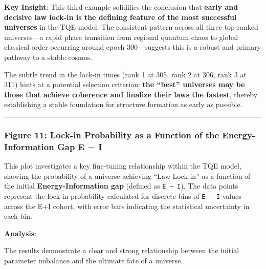\textbf{Key Insight}: This third example solidifies the conclusion that
\textbf{early and decisive law lock-in is the defining feature of the
most successful universes} in the TQE model. The consistent pattern
across all three top-ranked universes---a rapid phase transition from
regional quantum chaos to global classical order occurring around epoch
300---suggests this is a robust and primary pathway to a stable cosmos.

The subtle trend in the lock-in times (rank 1 at 305, rank 2 at 306,
rank 3 at 311) hints at a potential selection criterion: \textbf{the
``best'' universes may be those that achieve coherence and finalize
their laws the fastest}, thereby establishing a stable foundation for
structure formation as early as possible.

\begin{center}\rule{0.5\linewidth}{0.5pt}\end{center}

\subsubsection{Figure 11: Lock-in Probability as a Function of the
Energy-Information Gap \textbar E −
I\textbar{}}\label{figure-11-lock-in-probability-as-a-function-of-the-energy-information-gap-e-i}

This plot investigates a key fine-tuning relationship within the TQE
model, showing the probability of a universe achieving ``Law Lock-in''
as a function of the initial \textbf{Energy-Information gap} (defined as
\texttt{\textbar{}E\ −\ I\textbar{}}). The data points represent the
lock-in probability calculated for discrete bins of
\texttt{\textbar{}E\ −\ I\textbar{}} values across the E+I cohort, with
error bars indicating the statistical uncertainty in each bin.

\textbf{Analysis}:

The results demonstrate a clear and strong relationship between the
initial parameter imbalance and the ultimate fate of a universe.

